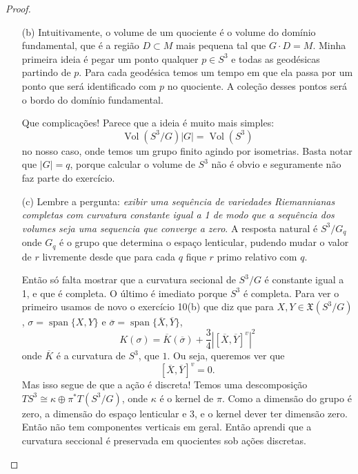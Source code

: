 \begin{proof}\leavevmode
\begin{enumerate}
	
	\item[(b)] Intuitivamente, o volume de um quociente é o volume do domínio fundamental, que é a região \(D\subset M\) mais pequena tal que \(G\cdot D=M\). Minha primeira ideia é pegar um ponto qualquer \(p \in S^3\) e todas as geodésicas partindo de \(p\). Para cada geodésica temos um tempo em que ela passa por um ponto que será identificado com \(p\) no quociente. A coleção desses pontos será o bordo do domínio fundamental.

Que complicações! Parece que a ideia é muito mais simples:
\[\operatorname{Vol}(S^3/G)|G|=\operatorname{Vol}(S^3)\]
no nosso caso, onde temos um grupo finito agindo por isometrias. Basta notar que \(|G|=q\), porque calcular o volume de \(S^3\) não é obvio e seguramente não faz parte do exercício.

\item[(c)] Lembre a pergunta: \textit{exibir uma sequência de variedades Riemannianas completas com curvatura constante igual a 1 de modo que a sequência dos volumes seja uma sequencia que converge a zero}. A resposta natural é \(S^3/G_q\) onde \(G_q\) é o grupo que determina o espaço lenticular, pudendo mudar o valor de \(r\) livremente desde que para cada \(q\) fique \(r\) primo relativo com \(q\).

	Então só falta mostrar que a curvatura secional de \(S^3/G\) é constante igual a 1, e que é completa. O último é imediato porque \(S^3\) é completa. Para ver o primeiro usamos de novo o exercício 10(b) que diz que para \(X,Y \in \mathfrak{X}(S^3/G)\), \(\sigma=\operatorname{span}\{X,Y\}\) e \(\overline{\sigma}=\operatorname{span}\{\overline{X}, \overline{Y}\}\),
\[\boxed{K(\sigma)=\overline{K}(\overline{\sigma})+\frac{3}{4}\left|\left[ \overline{X},\overline{Y} \right]^v\right|^2}\]
onde \(\overline{K}\) é a curvatura de \(S^3\), que \(1\). Ou seja, queremos ver que
\[\left[ \overline{X},\overline{Y} \right]^v=0.\]
Mas isso segue de que a ação é discreta! Temos uma descomposição \(TS^3 \cong \kappa \oplus  \pi^*T(S^3/G)\), onde \(\kappa\) é o kernel de \(\pi\). Como a dimensão do grupo é zero, a dimensão do espaço lenticular e 3, e o kernel dever ter dimensão zero. Então não tem componentes verticais em geral. Então aprendi que a curvatura seccional é preservada em quocientes sob ações discretas.
	
\end{enumerate}
\end{proof}

